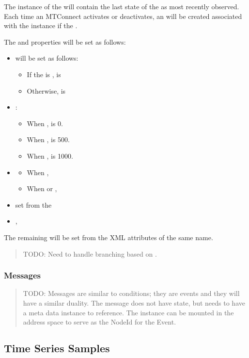 The instance of the  will contain the last state of the  as most recently observed. Each time an MTConnect  activates or deactivates, an   will be created associated with the instance if the  . 

The  and  properties will be set as follows:

\begin{itemize}
    \item {} will be set as follows:
    \begin{itemize}
        \item If the  is ,  is 
        \item Otherwise,  is 
    \end{itemize}
    \item {}:
    \begin{itemize}
        \item When ,  is 0.
        \item When ,  is 500.
        \item When ,  is 1000.
    \end{itemize}
    \item {}
    \begin{itemize}
        \item When , 
        \item When  or , 
    \end{itemize}
    \item {} set from the 
    \item {}, 
\end{itemize}

The remaining  will be set from the XML attributes of the same name.

\begin{quote}
    \color{red} TODO: Need to handle branching based on .
\end{quote}

\subsubsection{Messages}

\begin{quote}
    \color{red} TODO: Messages are similar to conditions; they are events and they will have a similar duality. The message does not have state, but needs to have a meta data instance to reference. The instance can be mounted in the address space to serve as the NodeId for the Event.
\end{quote}


\subsection{Time Series Samples}
